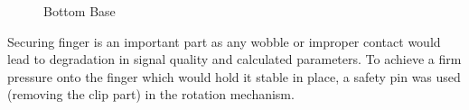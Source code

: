 	
		\begin{figure}[ht!]
			\centering
			\hfill
			\caption{Bottom Base}
		\end{figure}
	
	
		Securing finger is an important part as any wobble or improper contact would lead to degradation in signal quality and calculated parameters. To achieve a firm pressure onto the finger which would hold it stable in place, a safety pin was used (removing the clip part) in the rotation mechanism.
		
